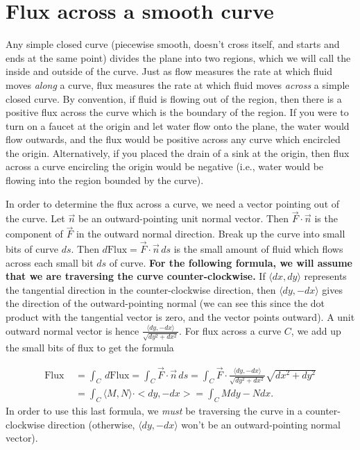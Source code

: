 \section{Flux across a smooth curve} 

Any simple closed curve (piecewise smooth, doesn't cross itself, and
starts and ends at the same point) divides the plane into two regions,
which we will call the inside and outside of the curve. Just as flow
measures the rate at which fluid moves \emph{along} a curve, flux
measures the rate at which fluid moves \emph{across} a simple closed
curve.  By convention, if fluid is flowing out of the region, then there
is a positive flux across the curve which is the boundary of the
region. If you were to turn on a faucet at the origin and let water
flow onto the plane, the water would flow outwards, and the flux would
be positive across any curve which encircled the origin.
Alternatively, if you placed the drain of a sink at the origin, then
flux across a curve encircling the origin would be negative (i.e.,
water would be flowing into the region bounded by the curve).

In order to determine the flux across a curve, we need a vector
pointing out of the curve.  Let $\vec n$ be an outward-pointing unit
normal vector.  Then $\vec F\cdot \vec n$ is the component of $\vec F$ in
the outward normal direction. Break up the curve into small bits of
curve $ds$.  Then $d\text{Flux} = \vec F\cdot \vec n \,ds$ is the small
amount of fluid which flows across each small bit $ds$ of
curve. \textbf{For the following formula, we will assume that we are
  traversing the curve counter-clockwise.}  If {$\langle dx,dy\rangle$} represents
the tangential direction in the counter-clockwise direction, then {$\langle
  dy,-dx\rangle$} gives the direction of the outward-pointing normal (we can
see this since the dot product with the tangential vector is zero, and
the vector points outward). A unit outward normal vector is hence $
\frac{\langle dy,-dx\rangle}{\sqrt{dy^2+dx^2}}$. For flux across a curve $C$, we
add up the small bits of flux to get the formula 

\begin{align*}
  \text{Flux } &= \int_C\,d\text{Flux} = \int_C\vec F\cdot \vec n \,ds = \int_C\vec
  F\cdot \frac{\langle dy,-dx\rangle}{\sqrt{dy^2+dx^2}} \sqrt{dx^2+dy^2} \\
  &= \int_C \langle M,N\rangle
  \cdot <dy,-dx> = \int_C Mdy-Ndx.
\end{align*}
  In order to use this last formula, we
\emph{must} be traversing the curve in a counter-clockwise direction
(otherwise, $\langle dy,-dx\rangle$ won't be an outward-pointing normal vector).

